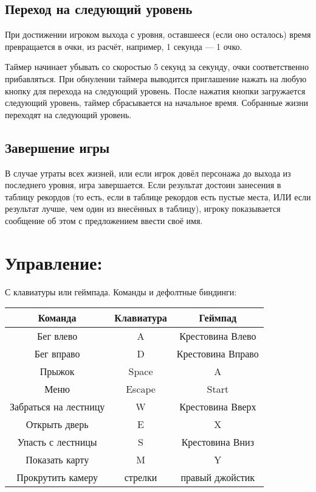 \documentclass[12pt,a4paper,fullpage]{article}
\begin{document}
\subsection{Переход на следующий уровень}
При достижении игроком выхода с уровня, оставшееся (если оно осталось) время превращается в очки, из расчёт, например, 1 секунда --- 1 очко.

Таймер начинает убывать со скоростью 5 секунд за секунду, очки соответственно прибавляться. При обнулении таймера выводится приглашение нажать на любую кнопку для перехода на следующий уровень. После нажатия кнопки загружается следующий уровень, таймер сбрасывается на начальное время. Собранные жизни переходят на следующий уровень.\\

\subsection{Завершение игры}
В случае утраты всех жизней, или если игрок довёл персонажа до выхода из последнего уровня, игра завершается. Если результат достоин занесения в таблицу рекордов (то есть, если в таблице рекордов есть пустые места, ИЛИ если результат лучше, чем один из внесённых в таблицу), игроку показывается сообщение об этом с предложением ввести своё имя.\\

\section{Управление:}
С клавиатуры или геймпада.
Команды и дефолтные биндинги:\\

\begin{tabulary}{\linewidth}{|C|C|C|}
\hline
Команда & Клавиатура & Геймпад\\
\hline
Бег влево & A & Крестовина Влево \\
\hline
Бег вправо & D & Крестовина Вправо \\
\hline
Прыжок & Space & A \\
\hline
Меню & Escape & Start \\
\hline
Забраться на лестницу & W & Крестовина Вверх \\
\hline
Открыть дверь & E & X \\
\hline
Упасть с лестницы & S & Крестовина Вниз \\
\hline
Показать карту & M & Y \\
\hline
Прокрутить камеру & стрелки & правый джойстик \\
\hline
\end{tabulary}
\vspace{10pt}
\end{document}
